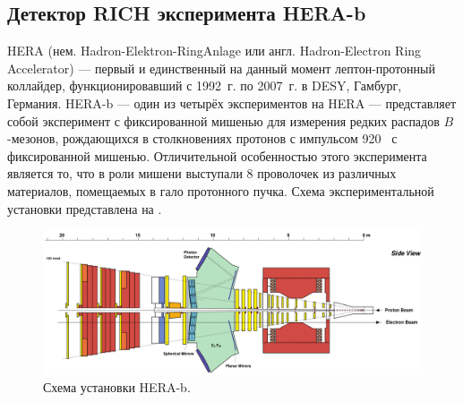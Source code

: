 
\subsection{Детектор RICH эксперимента HERA-b}\label{sec:HerabRich}



HERA (нем. Hadron-Elektron-RingAnlage или англ. Hadron-Electron Ring Accelerator) --- первый и единственный на данный момент лептон-протонный коллайдер, функционировавший с 1992~г. по 2007~г. в DESY, Гамбург, Германия. HERA-b --- один из четырёх экспериментов на HERA --- представляет собой эксперимент с фиксированной мишенью для измерения редких распадов $B$-мезонов, рождающихся в столкновениях протонов с импульсом 920~\GeVoverC{} с фиксированной мишенью. Отличительной особенностью этого эксперимента является то, что в роли мишени выступали 8 проволочек из различных материалов, помещаемых в гало протонного пучка. Схема экспериментальной установки представлена на .



\begin{figure}[H]
\centering
\includegraphics[width=1.0\textwidth]{pictures/HERA_b_setup.png}
\caption{Схема установки HERA-b.}
\label{fig:HERAbSetup}
\end{figure}

